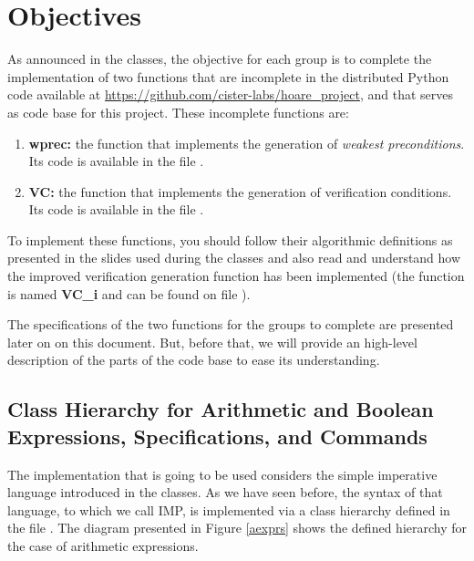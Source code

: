 \documentclass[11pt]{article}
\begin{document}
\newcommand{\compn}[1]{\textsf{\textcolor{purple}{#1}}\xspace}
\newcommand{\chn}[1]{\textsf{\textcolor{teal}{#1}}\xspace}

\section{Objectives}

As announced in the classes, the objective for each group is to complete the implementation of two functions that are incomplete in the distributed  Python code available at \url{https://github.com/cister-labs/hoare_project}, and that serves as code base for this project. These incomplete functions are:\\

\begin{enumerate}
  \item \textbf{wprec:} the function that implements the generation of \textit{weakest preconditions}. Its code is available in the file .
  \item \textbf{VC:} the function that implements the generation of verification conditions. Its code is available in the file .
\end{enumerate}

To implement these functions, you should follow their algorithmic definitions as presented in the slides used during the classes and also read and understand how the improved verification generation function has been implemented (the function is named \textbf{VC\_i} and can be found on file ). 

The specifications of the two functions for the groups to complete are presented later on on this document. But, before that, we will provide an high-level description of the parts of the code base to ease its understanding.

\subsection{Class Hierarchy for Arithmetic and Boolean Expressions, Specifications, and Commands}

The implementation that is going to be used considers the simple imperative language introduced in the classes. As we have seen before, the syntax of that language, to which we call IMP, is implemented via a class hierarchy defined in the file . The diagram presented in Figure \ref{aexprs} shows the defined hierarchy for the case of arithmetic expressions.
\end{document}
